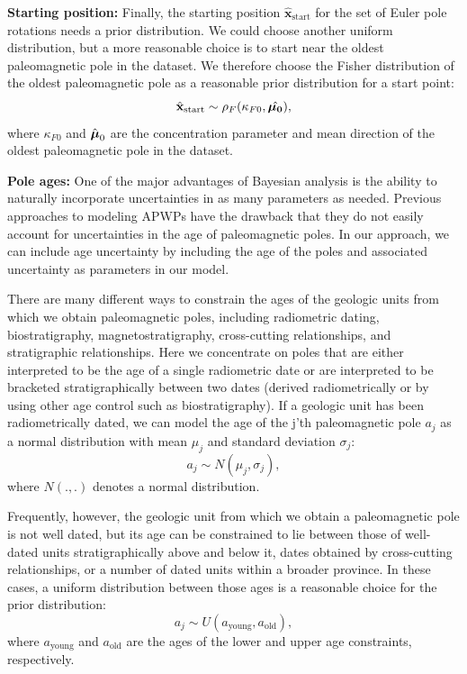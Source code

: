 \documentclass[11pt,letterpaper]{article}
\newcommand{\mitbf}[1]{\hbox{\mathversion{bold}$#1$}}
\begin{document}
\textbf{Starting position:}
Finally, the starting position $\hat{\mathbf{x}}_\mathrm{start}$ for the set of Euler pole rotations needs a prior distribution. We could choose another uniform distribution, but a more reasonable choice is to start near the oldest paleomagnetic pole in the dataset. We therefore choose the Fisher distribution of the oldest paleomagnetic pole as a reasonable prior distribution for a start point:
\begin{equation}
\hat{\mathbf{x}}_\mathrm{start} \sim \rho_F(\kappa_{F0}, \hat{\mitbf{\mu_0}}),
\end{equation}
where $\kappa_{F0}$ and $\hat{\mitbf{\mu}}_0$ are the concentration parameter and mean direction of the oldest paleomagnetic pole in the dataset.

\textbf{Pole ages:}
One of the major advantages of Bayesian analysis is the ability to naturally incorporate uncertainties in as many parameters as needed. Previous approaches to modeling APWPs have the drawback that they do not easily account for uncertainties in the age of paleomagnetic poles. In our approach, we can include age uncertainty by including the age of the poles and associated uncertainty as parameters in our model.

There are many different ways to constrain the ages of the geologic units from which we obtain paleomagnetic poles, including radiometric dating, biostratigraphy, magnetostratigraphy, cross-cutting relationships, and stratigraphic relationships. Here we concentrate on poles that are either interpreted to be the age of a single radiometric date or are interpreted to be bracketed stratigraphically between two dates (derived radiometrically or by using other age control such as biostratigraphy). If a geologic unit has been radiometrically dated, we can model the age of the j'th paleomagnetic pole $a_j$ as a normal distribution with mean $\mu_j$ and standard deviation $\sigma_j$:
\begin{equation}
a_j \sim N(\mu_j, \sigma_j),
\end{equation}
where $N(.,.)$ denotes a normal distribution.

Frequently, however, the geologic unit from which we obtain a paleomagnetic pole is not well dated, but its age can be constrained to lie between those of well-dated units stratigraphically above and below it, dates obtained by cross-cutting relationships, or a number of dated units within a broader province. In these cases, a uniform distribution between those ages is a reasonable choice for the prior distribution:
\begin{equation}
a_j \sim U(a_\mathrm{young}, a_\mathrm{old}),
\end{equation}
where $a_\mathrm{young}$ and $a_\mathrm{old}$ are the ages of the lower and upper age constraints, respectively.
\end{document}
